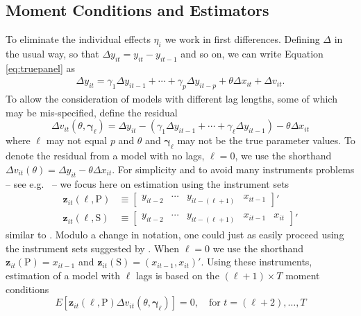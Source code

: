 \subsection{Moment Conditions and Estimators}
To eliminate the individual effects $\eta_i$ we work in first differences.
Defining $\Delta$ in the usual way, so that $\Delta y_{it} = y_{it} - y_{it-1}$ and so on, we can write Equation \ref{eq:truepanel} as
\begin{align}
  \Delta y_{it} = \gamma_1 \Delta y_{it-1} + \cdots + \gamma_p \Delta y_{it-p} + \theta \Delta x_{it} + \Delta v_{it}.
  \label{eq:truepaneldiff}
\end{align}
To allow the consideration of models with different lag lengths, some of which may be mis-specified, define the residual
\begin{equation}
  \Delta v_{it}\left(\theta, \boldsymbol{\gamma}_\ell \right) = \Delta y_{it} - \left(\gamma_1 \Delta y_{it-1} + \cdots + \gamma_\ell \Delta y_{it-1} \right) - \theta \Delta x_{it} 
  \label{eq:panelresidual}
\end{equation}
where $\ell$ may not equal $p$ and $\theta$ and $\boldsymbol{\gamma}_\ell$ may not be the true parameter values.
To denote the residual from a model with no lags, $\ell = 0$, we use the shorthand $\Delta v_{it}(\theta) = \Delta y_{it} - \theta \Delta x_{it}$.
For simplicity and to avoid many instruments problems -- see e.g.\ \cite{Roodman} -- we focus here on estimation using the instrument sets
\begin{align}
  \mathbf{z}_{it}(\ell,\text{P}) &\equiv \left[
  \begin{array}{cccc}
    y_{it-2} & \cdots & y_{it-(\ell + 1)} & x_{it-1}
  \end{array}
\right]'
  \label{eq:ZdpanelP}
\\
\mathbf{z}_{it}(\ell, \text{S}) &\equiv \left[
\begin{array}{ccccc}
  y_{it-2} & \cdots & y_{it-(\ell + 1)} & x_{it-1} & x_{it}
\end{array}
\right]'
  \label{eq:ZdpanelS}
\end{align}
similar to \cite{AndersonHsiao}.
Modulo a change in notation, one could just as easily proceed using the instrument sets suggested by \cite{ArellanoBond}.
When $\ell = 0$ we use the shorthand $\mathbf{z}_{it}(\text{P}) = x_{it-1}$ and $\mathbf{z}_{it}(\text{S}) = (x_{it-1}, x_{it})'$.
Using these instruments, estimation of a model with $\ell$ lags is based on the $(\ell + 1)\times T$ moment conditions
\begin{equation}
  E\left[ \mathbf{z}_{it}(\ell,\mbox{P})\Delta v_{it}(\theta, \boldsymbol{\gamma}_\ell) \right] = 0, \quad \mbox{for } t = (\ell + 2),\dots, T
  \label{eq:MCdpanelP}
\end{equation}
